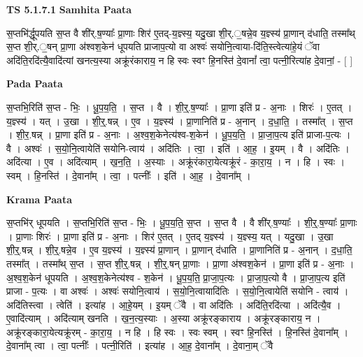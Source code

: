 \documentclass[17pt]{extarticle}
\begin{document}
\textbf{TS 5.1.7.1 } \newline
\textbf{Samhita Paata} \newline

स॒प्तभि॑र्द्धूपयति स॒प्त वै शी॑र्.ष॒ण्याः᳚ प्रा॒णाः शिर॑ ए॒तद्-य॒ज्ञ्स्य॒ यदु॒खा शी॒र्.॒षन्ने॒व य॒ज्ञ्स्य॑ प्रा॒णान् द॑धाति॒ तस्मा᳚थ् स॒प्त शी॒र्.॒षन् प्रा॒णा अ॑श्वश॒केन॑ धूपयति प्राजाप॒त्यो वा अश्वः॑ सयोनि॒त्वाया-दि॑ति॒स्त्वेत्या॑हे॒यं ॅवा अदि॑ति॒रदि॑त्यै॒वादि॑त्यां खनत्य॒स्या अक्रू॑रंकाराय॒ न हि स्वः स्वꣳ हि॒नस्ति॑ दे॒वानां᳚ त्वा॒ पत्नी॒रित्या॑ह दे॒वानां॒ - [  ] \newline

\textbf{Pada Paata} \newline

स॒प्तभि॒रिति॑ स॒प्त - भिः॒ । धू॒प॒य॒ति॒ । स॒प्त । वै । शी॒र्॒.ष॒ण्याः᳚ । प्रा॒णा इति॑ प्र - अ॒नाः । शिरः॑ । ए॒तत् । य॒ज्ञ्स्य॑ । यत् । उ॒खा । शी॒र्॒.षन्न् । ए॒व । य॒ज्ञ्स्य॑ । प्रा॒णानिति॑ प्र - अ॒नान् । द॒धा॒ति॒ । तस्मा᳚त् । स॒प्त । शी॒र॒.षन्न् । प्रा॒णा इति॑ प्र - अ॒नाः । अ॒श्व॒श॒केनेत्य॑श्व-श॒केन॑ । धू॒प॒य॒ति॒ । प्रा॒जा॒प॒त्य इति॑ प्राजा-प॒त्यः । वै । अश्वः॑ । स॒यो॒नि॒त्वायेति॑ सयोनि-त्वाय॑ । अदि॑तिः । त्वा॒ । इति॑ । आ॒ह॒ । इ॒यम् । वै । अदि॑तिः । अदि॑त्या । ए॒व । अदि॑त्याम् । ख॒न॒ति॒ । अ॒स्याः । अक्रू॑रंकारा॒येत्यक्रू॑रं - का॒रा॒य॒ । न । हि । स्वः । स्वम् । हि॒नस्ति॑ । दे॒वाना᳚म् । त्वा॒ । पत्नीः᳚ । इति॑ । आ॒ह॒ । दे॒वाना᳚म् ।  \newline


\textbf{Krama Paata} \newline

स॒प्तभि॑र् धूपयति । स॒प्तभि॒रिति॑ स॒प्त - भिः॒ । धू॒प॒य॒ति॒ स॒प्त । स॒प्त वै । वै शी॑र्.ष॒ण्याः᳚ । शी॒र्॒.ष॒ण्याः᳚ प्रा॒णाः । प्रा॒णाः शिरः॑ । प्रा॒णा इति॑ प्र - अ॒नाः । शिर॑ ए॒तत् । ए॒तद् य॒ज्ञ्स्य॑ । य॒ज्ञ्स्य॒ यत् । यदु॒खा । उ॒खा शी॒र्॒.षन्न् । शी॒र्॒.षन्ने॒व । ए॒व य॒ज्ञ्स्य॑ । य॒ज्ञ्स्य॑ प्रा॒णान् । प्रा॒णान् द॑धाति । प्रा॒णानिति॑ प्र - अ॒नान् । द॒धा॒ति॒ तस्मा᳚त् । तस्मा᳚थ् स॒प्त । स॒प्त शी॒र्॒.षन्न् । शी॒र्॒.षन् प्रा॒णाः । प्रा॒णा अ॑श्वश॒केन॑ । प्रा॒णा इति॑ प्र - अ॒नाः । अ॒श्व॒श॒केन॑ धूपयति । अ॒श्व॒श॒केनेत्य॑श्व - श॒केन॑ । धू॒प॒य॒ति॒ प्रा॒जा॒प॒त्यः । प्रा॒जा॒प॒त्यो वै । प्रा॒जा॒प॒त्य इति॑ प्राजा - प॒त्यः । वा अश्वः॑ । अश्वः॑ सयोनि॒त्वाय॑ । स॒यो॒नि॒त्वायादि॑तिः । स॒यो॒नि॒त्वायेति॑ सयोनि - त्वाय॑ । अदि॑तिस्त्वा । त्वेति॑ । इत्या॑ह । आ॒हे॒यम् । इ॒यम् ॅवै । वा अदि॑तिः । अदि॑ति॒रदि॑त्या । अदि॑त्यै॒व । ए॒वादि॑त्याम् । अदि॑त्याम् खनति । ख॒न॒त्य॒स्याः । अ॒स्या अक्रू॑रङ्काराय । अक्रू॑रङ्काराय॒ न । अक्रू॑रङ्कारा॒येत्यक्रू॑रम् - का॒रा॒य॒ । न हि । हि स्वः । स्वः स्वम् । स्वꣳ हि॒नस्ति॑ । हि॒नस्ति॑ दे॒वाना᳚म् । दे॒वाना᳚म् त्वा । त्वा॒ पत्नीः᳚ । पत्नी॒रिति॑ । इत्या॑ह । आ॒ह॒ दे॒वाना᳚म् । दे॒वाना॒म् ॅवै \newline
\end{document}
